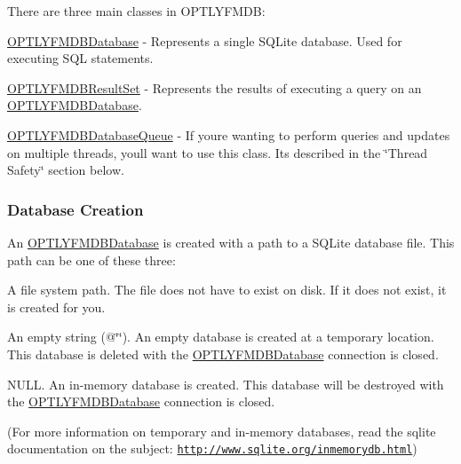 There are three main classes in O\+P\+T\+L\+Y\+F\+M\+DB\+:


\begin{DoxyEnumerate}
\item {\ttfamily \mbox{\hyperlink{interface_o_p_t_l_y_f_m_d_b_database}{O\+P\+T\+L\+Y\+F\+M\+D\+B\+Database}}} -\/ Represents a single S\+Q\+Lite database. Used for executing S\+QL statements.
\item {\ttfamily \mbox{\hyperlink{interface_o_p_t_l_y_f_m_d_b_result_set}{O\+P\+T\+L\+Y\+F\+M\+D\+B\+Result\+Set}}} -\/ Represents the results of executing a query on an {\ttfamily \mbox{\hyperlink{interface_o_p_t_l_y_f_m_d_b_database}{O\+P\+T\+L\+Y\+F\+M\+D\+B\+Database}}}.
\item {\ttfamily \mbox{\hyperlink{interface_o_p_t_l_y_f_m_d_b_database_queue}{O\+P\+T\+L\+Y\+F\+M\+D\+B\+Database\+Queue}}} -\/ If you\textquotesingle{}re wanting to perform queries and updates on multiple threads, you\textquotesingle{}ll want to use this class. It\textquotesingle{}s described in the \char`\"{}\+Thread Safety\char`\"{} section below.
\end{DoxyEnumerate}

\subsubsection*{Database Creation}

An {\ttfamily \mbox{\hyperlink{interface_o_p_t_l_y_f_m_d_b_database}{O\+P\+T\+L\+Y\+F\+M\+D\+B\+Database}}} is created with a path to a S\+Q\+Lite database file. This path can be one of these three\+:


\begin{DoxyEnumerate}
\item A file system path. The file does not have to exist on disk. If it does not exist, it is created for you.
\item An empty string ({\ttfamily @\char`\"{}\char`\"{}}). An empty database is created at a temporary location. This database is deleted with the {\ttfamily \mbox{\hyperlink{interface_o_p_t_l_y_f_m_d_b_database}{O\+P\+T\+L\+Y\+F\+M\+D\+B\+Database}}} connection is closed.
\item {\ttfamily N\+U\+LL}. An in-\/memory database is created. This database will be destroyed with the {\ttfamily \mbox{\hyperlink{interface_o_p_t_l_y_f_m_d_b_database}{O\+P\+T\+L\+Y\+F\+M\+D\+B\+Database}}} connection is closed.
\end{DoxyEnumerate}

(For more information on temporary and in-\/memory databases, read the sqlite documentation on the subject\+: \href{http://www.sqlite.org/inmemorydb.html}{\tt http\+://www.\+sqlite.\+org/inmemorydb.\+html})


